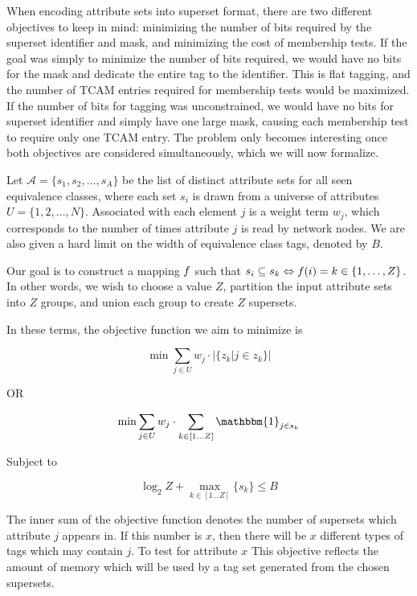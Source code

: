 When encoding attribute sets into superset format, there are two different objectives to keep in mind: minimizing the number of bits required by the superset identifier and mask, and minimizing the cost of membership tests. If the goal was simply to minimize the number of bits required, we would have no bits for the mask and dedicate the entire tag to the identifier. This is flat tagging, and the number of TCAM entries required for membership tests would be maximized. If the number of bits for tagging was unconstrained, we would have no bits for superset identifier and simply have one large mask, causing each membership test to require only one TCAM entry. The problem only becomes interesting once both objectives are considered simultaneously, which we will now formalize. 

Let $\mathcal{A} = \{s_1, s_2, \dots, s_A \}$ be the list of distinct attribute sets for all seen equivalence classes, where each set $s_i$ is drawn from a universe of attributes $U = \{1, 2, \dots, N\}$. Associated with each element $j$ is a weight term $w_j$, which corresponds to the number of times attribute $j$ is read by network nodes. We are also given a hard limit on the width of equivalence class tags, denoted by $B$. 

Our goal is to construct a mapping $\mathnormal{f}$ such that 
$s_i \subseteq s_k \Leftrightarrow  \mathnormal{f}(i) = k \in \{1, \dots, Z\} $. In other words, we wish to choose a value $Z$, partition the input attribute sets into $Z$ groups, and union each group to create $Z$ supersets.

In these terms, the objective function we aim to minimize is

\begin{samepage}
$$ \min \sum_{j \in U} w_j \cdot |\{z_k | j \in z_k \}| $$

OR

$$ \min \sum_{j \in U} w_j \cdot \sum_{k \in [1\dots Z]}\mathbbm{1}_{j \in s_k} $$

Subject to

$$ \log_2{Z} + \max_{k \in [1\dots Z]}\{s_k\} \le B $$

\end{samepage}

The inner sum of the objective function denotes the number of supersets which attribute $j$ appears in. If this number is $x$, then there will be $x$ different types of tags which may contain $j$. To test for attribute $x$
This objective reflects the amount of memory which will be used by a tag set generated from the chosen supersets. 



